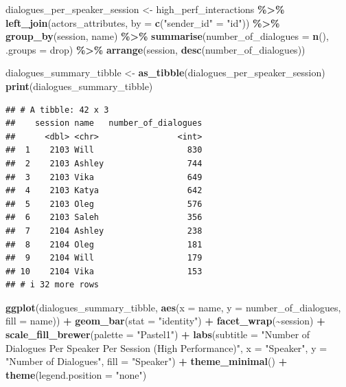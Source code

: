 \documentclass[
]{article}
\newenvironment{Shaded}{\begin{snugshade}}{\end{snugshade}}
\newcommand{\AttributeTok}[1]{\textcolor[rgb]{0.13,0.29,0.53}{#1}}
\newcommand{\FunctionTok}[1]{\textcolor[rgb]{0.13,0.29,0.53}{\textbf{#1}}}
\newcommand{\NormalTok}[1]{#1}
\newcommand{\OtherTok}[1]{\textcolor[rgb]{0.56,0.35,0.01}{#1}}
\newcommand{\SpecialCharTok}[1]{\textcolor[rgb]{0.81,0.36,0.00}{\textbf{#1}}}
\newcommand{\StringTok}[1]{\textcolor[rgb]{0.31,0.60,0.02}{#1}}
\begin{document}
\begin{Shaded}
\begin{Highlighting}[]
\NormalTok{dialogues\_per\_speaker\_session }\OtherTok{\textless{}{-}}\NormalTok{ high\_perf\_interactions }\SpecialCharTok{\%\textgreater{}\%}
  \FunctionTok{left\_join}\NormalTok{(actors\_attributes, }\AttributeTok{by =} \FunctionTok{c}\NormalTok{(}\StringTok{"sender\_id"} \OtherTok{=} \StringTok{"id"}\NormalTok{)) }\SpecialCharTok{\%\textgreater{}\%}
  \FunctionTok{group\_by}\NormalTok{(session, name) }\SpecialCharTok{\%\textgreater{}\%}
  \FunctionTok{summarise}\NormalTok{(}\AttributeTok{number\_of\_dialogues =} \FunctionTok{n}\NormalTok{(), }\AttributeTok{.groups =} \StringTok{\textquotesingle{}drop\textquotesingle{}}\NormalTok{) }\SpecialCharTok{\%\textgreater{}\%}
  \FunctionTok{arrange}\NormalTok{(session, }\FunctionTok{desc}\NormalTok{(number\_of\_dialogues))}

\NormalTok{dialogues\_summary\_tibble }\OtherTok{\textless{}{-}} \FunctionTok{as\_tibble}\NormalTok{(dialogues\_per\_speaker\_session)}
\FunctionTok{print}\NormalTok{(dialogues\_summary\_tibble)}
\end{Highlighting}
\end{Shaded}

\begin{verbatim}
## # A tibble: 42 x 3
##    session name   number_of_dialogues
##      <dbl> <chr>                <int>
##  1    2103 Will                   830
##  2    2103 Ashley                 744
##  3    2103 Vika                   649
##  4    2103 Katya                  642
##  5    2103 Oleg                   576
##  6    2103 Saleh                  356
##  7    2104 Ashley                 238
##  8    2104 Oleg                   181
##  9    2104 Will                   179
## 10    2104 Vika                   153
## # i 32 more rows
\end{verbatim}

\begin{Shaded}
\begin{Highlighting}[]
\FunctionTok{ggplot}\NormalTok{(dialogues\_summary\_tibble, }\FunctionTok{aes}\NormalTok{(}\AttributeTok{x =}\NormalTok{ name, }\AttributeTok{y =}\NormalTok{ number\_of\_dialogues, }\AttributeTok{fill =}\NormalTok{ name)) }\SpecialCharTok{+} 
  \FunctionTok{geom\_bar}\NormalTok{(}\AttributeTok{stat =} \StringTok{"identity"}\NormalTok{) }\SpecialCharTok{+}
  \FunctionTok{facet\_wrap}\NormalTok{(}\SpecialCharTok{\textasciitilde{}}\NormalTok{session) }\SpecialCharTok{+}
  \FunctionTok{scale\_fill\_brewer}\NormalTok{(}\AttributeTok{palette =} \StringTok{"Pastel1"}\NormalTok{) }\SpecialCharTok{+}  
  \FunctionTok{labs}\NormalTok{(}\AttributeTok{subtitle =} \StringTok{"Number of Dialogues Per Speaker Per Session (High Performance)"}\NormalTok{,}
       \AttributeTok{x =} \StringTok{"Speaker"}\NormalTok{,}
       \AttributeTok{y =} \StringTok{"Number of Dialogues"}\NormalTok{,}
       \AttributeTok{fill =} \StringTok{"Speaker"}\NormalTok{) }\SpecialCharTok{+}
  \FunctionTok{theme\_minimal}\NormalTok{() }\SpecialCharTok{+} 
  \FunctionTok{theme}\NormalTok{(}\AttributeTok{legend.position =} \StringTok{"none"}\NormalTok{) }
\end{Highlighting}
\end{Shaded}
\end{document}
